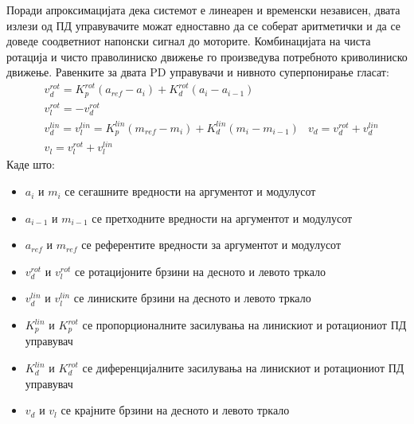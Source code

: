 \documentclass[11pt]{article}
\begin{document}
      Поради апроксимацијата дека системот е линеарен и временски независен, двата излези од ПД управувачите можат едноставно да се соберат аритметички и да се доведе соодветниот напонски сигнал до моторите. Комбинацијата на чиста ротација и чисто праволиниско движење го произведува потребното криволиниско движење. Равенките за двата PD управувачи и нивното суперпонирање гласат:
      \begin{align}
        & v_d^{rot} = K_p^{rot}(a_{ref} - a_i) + K_d^{rot}(a_i - a_{i-1})\\
        & v_l^{rot} = -v_d^{rot}\\
        & v_d^{lin} = v_l^{lin} = K_p^{lin}(m_{ref} - m_i) + K_d^{lin}(m_i - m_{i-1})
        & v_d = v_d^{rot} + v_d^{lin} \\
        & v_l = v_l^{rot} + v_l^{lin}
      \end{align}
      Каде што:
      \begin{itemize}
        \item $a_i$ и $m_i$ се сегашните вредности на аргументот и модулусот
        \item $a_{i-1}$ и $m_{i-1}$ се претходните вредности на аргументот и модулусот
        \item $a_{ref}$ и $m_{ref}$ се референтите вредности за аргументот и модулусот
        \item $v_d^{rot}$ и $v_l^{rot}$ се ротацијоните брзини на десното и левото тркало
        \item $v_d^{lin}$ и $v_l^{lin}$ се линиските брзини на десното и левото тркало
        \item $K_p^{lin}$ и $K_p^{rot}$ се пропорционалните засилувања на линискиот и ротациониот ПД управувач
        \item $K_d^{lin}$ и $K_d^{rot}$ се диференцијалните засилувања на линискиот и ротациониот ПД управувач
        \item $v_d$ и $v_l$ се крајните брзини на десното и левото тркало
      \end{itemize}

\end{document}
